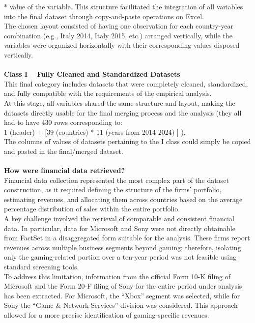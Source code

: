 * value of the variable.
This structure facilitated the integration of all variables into the final dataset through copy-and-paste operations on Excel.\\
The chosen layout consisted of having one observation for each country-year combination (e.g., Italy 2014, Italy 2015, etc.) arranged vertically, while the variables were organized horizontally with their corresponding values disposed vertically.
\\\\
\textbf{Class I – Fully Cleaned and Standardized Datasets}\\
This final category includes datasets that were completely cleaned, standardized, and fully compatible with the requirements of the empirical analysis.\\
At this stage, all variables shared the same structure and layout, making the datasets directly usable for the final merging process and the analysis (they all had to have 430 rows corresponding to:\\ 1 (header) + [39 (countries) * 11 (years from 2014-2024) ] ).\\
The columns of values of datasets pertaining to the I class could simply be copied and pasted in the final/merged dataset.
\\\\
\textbf{How were financial data retrieved?}\\
Financial data collection represented the most complex part of the dataset construction, as it required defining the structure of the firms' portfolio, estimating revenues, and allocating them across countries based on the average percentage distribution of sales within the entire portfolio.\\
A key challenge involved the retrieval of comparable and consistent financial data. In particular, data for Microsoft and Sony were not directly obtainable from FactSet in a disaggregated form suitable for the analysis. These firms report revenues across multiple business segments beyond gaming; therefore, isolating only the gaming-related portion over a ten-year period was not feasible using standard screening tools.\\
To address this limitation, information from the official Form 10-K filing of Microsoft and the Form 20-F filing of Sony for the entire period under analysis has been extracted. For Microsoft, the “Xbox” segment was selected, while for Sony the “Game \& Network Services” division was considered. This approach allowed for a more precise identification of gaming-specific revenues.\\
